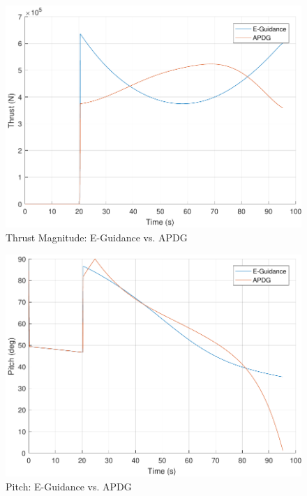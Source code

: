 \begin{figure}[H]
	\centering
	\begin{minipage}{4.3 in}
		\includegraphics[width=\linewidth]{Figures/thrEvsAPDG.pdf}
		\caption{Thrust Magnitude: E-Guidance vs. APDG \label{fig:thrEvsAPDG} }
	\end{minipage}
\end{figure}

\begin{figure}[H]
	\centering
	\begin{minipage}{4.3 in}
		\includegraphics[width=\linewidth]{Figures/fatEvsAPDG.pdf}
		\caption{Pitch: E-Guidance vs. APDG \label{fig:fatEvsAPDG} }
	\end{minipage}
\end{figure}

